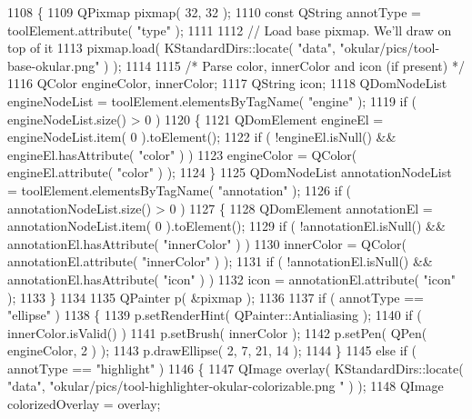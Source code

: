 \begin{DoxyCode}
1108 \{
1109     QPixmap pixmap( 32, 32 );
1110     \textcolor{keyword}{const} QString annotType = toolElement.attribute( \textcolor{stringliteral}{"type"} );
1111 
1112     \textcolor{comment}{// Load base pixmap. We'll draw on top of it}
1113     pixmap.load( KStandardDirs::locate( \textcolor{stringliteral}{"data"}, \textcolor{stringliteral}{"okular/pics/tool-base-okular.png"} ) );
1114 
1115     \textcolor{comment}{/* Parse color, innerColor and icon (if present) */}
1116     QColor engineColor, innerColor;
1117     QString icon;
1118     QDomNodeList engineNodeList = toolElement.elementsByTagName( \textcolor{stringliteral}{"engine"} );
1119     \textcolor{keywordflow}{if} ( engineNodeList.size() > 0 )
1120     \{
1121         QDomElement engineEl = engineNodeList.item( 0 ).toElement();
1122         \textcolor{keywordflow}{if} ( !engineEl.isNull() && engineEl.hasAttribute( \textcolor{stringliteral}{"color"} ) )
1123             engineColor = QColor( engineEl.attribute( \textcolor{stringliteral}{"color"} ) );
1124     \}
1125     QDomNodeList annotationNodeList = toolElement.elementsByTagName( \textcolor{stringliteral}{"annotation"} );
1126     \textcolor{keywordflow}{if} ( annotationNodeList.size() > 0 )
1127     \{
1128         QDomElement annotationEl = annotationNodeList.item( 0 ).toElement();
1129         \textcolor{keywordflow}{if} ( !annotationEl.isNull() && annotationEl.hasAttribute( \textcolor{stringliteral}{"innerColor"} ) )
1130             innerColor = QColor( annotationEl.attribute( \textcolor{stringliteral}{"innerColor"} ) );
1131         \textcolor{keywordflow}{if} ( !annotationEl.isNull() && annotationEl.hasAttribute( \textcolor{stringliteral}{"icon"} ) )
1132             icon = annotationEl.attribute( \textcolor{stringliteral}{"icon"} );
1133     \}
1134 
1135     QPainter p( &pixmap );
1136 
1137     \textcolor{keywordflow}{if} ( annotType == \textcolor{stringliteral}{"ellipse"} )
1138     \{
1139         p.setRenderHint( QPainter::Antialiasing );
1140         \textcolor{keywordflow}{if} ( innerColor.isValid() )
1141             p.setBrush( innerColor );
1142         p.setPen( QPen( engineColor, 2 ) );
1143         p.drawEllipse( 2, 7, 21, 14 );
1144     \}
1145     \textcolor{keywordflow}{else} \textcolor{keywordflow}{if} ( annotType == \textcolor{stringliteral}{"highlight"} )
1146     \{
1147         QImage overlay( KStandardDirs::locate( \textcolor{stringliteral}{"data"}, \textcolor{stringliteral}{"okular/pics/tool-highlighter-okular-colorizable.png
      "} ) );
1148         QImage colorizedOverlay = overlay;

\end{DoxyCode}
